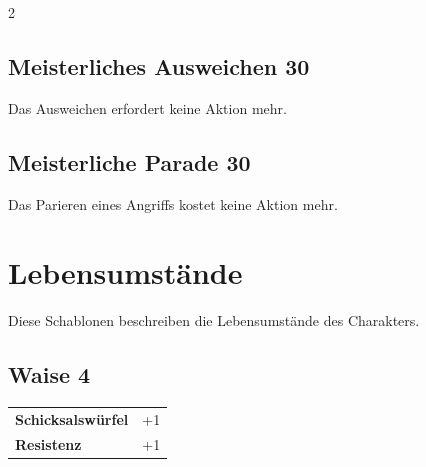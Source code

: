 \begin{multicols}{2}
\begin{tcolorbox}
\end{tcolorbox}

\begin{tcolorbox}
    \subsection*{Meisterliches Ausweichen \hfill \small{30 }}
    \tcblower
Das Ausweichen erfordert keine Aktion mehr.


\vspace{3mm}



\end{tcolorbox}

\begin{tcolorbox}
    \subsection*{Meisterliche Parade \hfill \small{30 }}
    \tcblower
Das Parieren eines Angriffs kostet keine Aktion mehr.


\vspace{3mm}



\end{tcolorbox}

\section{Lebensumstände}

Diese Schablonen beschreiben die Lebensumstände des Charakters.

\begin{tcolorbox}
    \subsection*{Waise \hfill \small{4 }}
    \tcblower




\begin{tabular}{@{}ll@{}}
    \textbf{Schicksalswürfel} & +1\\
    \textbf{Resistenz} & +1\\
\end{tabular}


\end{tcolorbox}
\end{multicols}
